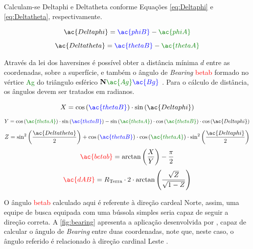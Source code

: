 Calculam-se \ac{Deltaphi} e \ac{Deltatheta} conforme Equações \ref{eq:Deltaphi} e \ref{eq:Deltatheta}, respectivamente.

    \begin{equation}\label{eq:Deltaphi}
        \ac{Deltaphi} = \textcolor{Blue}{\ac{phiB}} - \textcolor{Green}{\ac{phiA}}
    \end{equation}
    \begin{equation}\label{eq:Deltatheta}
        \ac{Deltatheta} = \textcolor{Blue}{\ac{thetaB}} - \textcolor{Green}{\ac{thetaA}}
    \end{equation}

Através da lei dos haversines é possível obter a distância mínima $d$ entre as coordenadas, sobre a superfície, e também o ângulo de \textit{Bearing} \textcolor{Red}{\ac{betab}} formado no vértice \textcolor{Green}{\ac{Ag}} do triângulo esférico $\mathbf{N}\textcolor{Green}{\ac{Ag}}\textcolor{Blue}{\ac{Bg}}$ \cite{chrisveness}.
Para o cálculo de distância, os ângulos devem ser tratados em radianos.

\begin{equation}
    X = \cos\left(\textcolor{Blue}{\ac{thetaB}}\right)\cdot \sin\left(\ac{Deltaphi}\right)
\end{equation}
\begin{equation}
    Y = \cos\left(\textcolor{Green}{\ac{thetaA}}\right)\cdot\sin\left(\textcolor{Blue}{\ac{thetaB}}\right) - \sin\left(\textcolor{Green}{\ac{thetaA}}\right) \cdot \cos\left(\textcolor{Green}{\ac{thetaB}}\right) \cdot \cos\left(\ac{Deltaphi}\right)
\end{equation}
\begin{equation}
    Z = \sin^2\left(\frac{\ac{Deltatheta}}{2}\right) + \cos\left(\textcolor{Blue}{\ac{thetaB}}\right) \cdot \cos\left(\textcolor{Green}{\ac{thetaA}}\right) \cdot \sin^2\left(\frac{\ac{Deltaphi}}{2}\right)
\end{equation}
\begin{equation}
    \textcolor{Red}{\ac{betab}} = \arctan\left(\frac{X}{Y}\right) - \frac{\pi}{2}
\end{equation}
\begin{equation}
    \textcolor{Red}{\ac{dAB}} = R_\text{Terra} \cdot 2 \cdot \arctan\left(\frac{\sqrt{Z}}{\sqrt{1-Z}}\right)
\end{equation}

O ângulo \textcolor{Red}{\ac{betab}} calculado aqui é referente à direção cardeal Norte, assim, uma equipe de busca equipada com uma bússola simples seria capaz de seguir a direção correta.
A \autoref{fig:bearing} apresenta a aplicação desenvolvida por \citeauthor{chrisveness}, capaz de calcular o ângulo de \textit{Bearing} entre duas coordenadas, note que, neste caso, o ângulo referido é relacionado à direção cardinal Leste \cite{chrisveness}.


